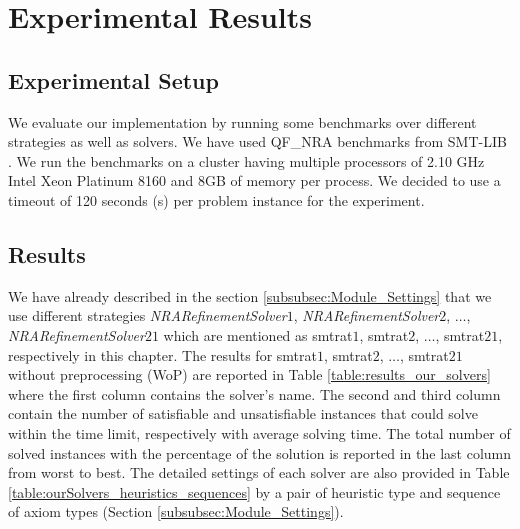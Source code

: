 \chapter{Experimental Results}
\label{chap:experimental_result}

\section{Experimental Setup}
We evaluate our implementation by running some benchmarks over different strategies as well as solvers.
We have used QF\_NRA benchmarks \cite{SMTLIB-benchmarks} from SMT-LIB \cite{BarFT-SMTLIB}.
We run the benchmarks on a cluster having multiple processors of 2.10 GHz Intel Xeon Platinum 8160 and 8GB of memory per process.
We decided to use a timeout of 120 seconds (s) per problem instance for the experiment.

\section{Results}
We have already described in the section \ref{subsubsec:Module_Settings} that we use different strategies \textit{NRARefinementSolver$1$}, \textit{NRARefinementSolver$2$}, $\dots$, \textit{NRARefinementSolver$21$} which are mentioned as  smtrat$1$, smtrat$2$, $\dots$, smtrat$21$, respectively in this chapter. 
The results for smtrat$1$, smtrat$2$, $\dots$, smtrat$21$ without preprocessing (WoP) are reported in Table \ref{table:results_our_solvers} where the first column contains the solver's name.
The second and third column contain the number of satisfiable and unsatisfiable instances that could solve within the time limit, respectively with average solving time.
The total number of solved instances with the percentage of the solution is reported in the last column from worst to best.
The detailed settings of each solver are also provided in Table \ref{table:ourSolvers_heuristics_sequences} by a pair of heuristic type and sequence of axiom types (Section \ref{subsubsec:Module_Settings}).\newline

